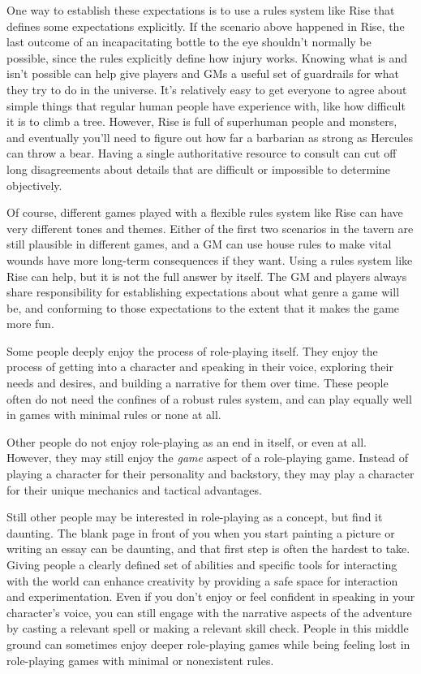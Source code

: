       One way to establish these expectations is to use a rules system like Rise that defines some expectations explicitly.
      If the scenario above happened in Rise, the last outcome of an incapacitating bottle to the eye shouldn't normally be possible, since the rules explicitly define how injury works.
      Knowing what is and isn't possible can help give players and GMs a useful set of guardrails for what they try to do in the universe.
      It's relatively easy to get everyone to agree about simple things that regular human people have experience with, like how difficult it is to climb a tree.
      However, Rise is full of superhuman people and monsters, and eventually you'll need to figure out how far a barbarian as strong as Hercules can throw a bear.
      Having a single authoritative resource to consult can cut off long disagreements about details that are difficult or impossible to determine objectively.

      Of course, different games played with a flexible rules system like Rise can have very different tones and themes.
      Either of the first two scenarios in the tavern are still plausible in different games, and a GM can use house rules to make vital wounds have more long-term consequences if they want.
      Using a rules system like Rise can help, but it is not the full answer by itself.
      The GM and players always share responsibility for establishing expectations about what genre a game will be, and conforming to those expectations to the extent that it makes the game more fun.

      Some people deeply enjoy the process of role-playing itself.
      They enjoy the process of getting into a character and speaking in their voice, exploring their needs and desires, and building a narrative for them over time.
      These people often do not need the confines of a robust rules system, and can play equally well in games with minimal rules or none at all.

      Other people do not enjoy role-playing as an end in itself, or even at all.
      However, they may still enjoy the \textit{game} aspect of a role-playing game.
      Instead of playing a character for their personality and backstory, they may play a character for their unique mechanics and tactical advantages.

      Still other people may be interested in role-playing as a concept, but find it daunting.
      The blank page in front of you when you start painting a picture or writing an essay can be daunting, and that first step is often the hardest to take.
      Giving people a clearly defined set of abilities and specific tools for interacting with the world can enhance creativity by providing a safe space for interaction and experimentation.
      Even if you don't enjoy or feel confident in speaking in your character's voice, you can still engage with the narrative aspects of the adventure by casting a relevant spell or making a relevant skill check.
      People in this middle ground can sometimes enjoy deeper role-playing games while being feeling lost in role-playing games with minimal or nonexistent rules.

